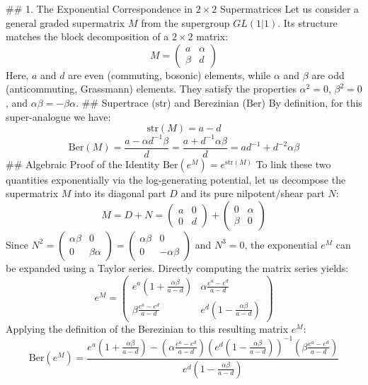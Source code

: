 ## 1. The Exponential Correspondence in $2 \times 2$ Supermatrices
Let us consider a general graded supermatrix $M$ from the supergroup $GL(1\vert{}1)$. Its structure matches the block decomposition of a $2 \times 2$ matrix:
$$M = \begin{pmatrix} a & \alpha \\ \beta & d \end{pmatrix}$$ 
Here, $a$ and $d$ are even (commuting, bosonic) elements, while $\alpha$ and $\beta$ are odd (anticommuting, Grassmann) elements. They satisfy the properties $\alpha^2 = 0$, $\beta^2 = 0$, and $\alpha\beta = -\beta\alpha$.
## Supertrace ($\text{str}$) and Berezinian ($\text{Ber}$)
By definition, for this super-analogue we have:
$$\text{str}(M) = a - d$$ 
$$\text{Ber}(M) = \frac{a - \alpha d^{-1} \beta}{d} = \frac{a + d^{-1}\alpha\beta}{d} = a d^{-1} + d^{-2}\alpha\beta$$ 
## Algebraic Proof of the Identity $\text{Ber}(e^M) = e^{\text{str}(M)}$
To link these two quantities exponentially via the log-generating potential, let us decompose the supermatrix $M$ into its diagonal part $D$ and its pure nilpotent/shear part $N$:
$$M = D + N = \begin{pmatrix} a & 0 \\ 0 & d \end{pmatrix} + \begin{pmatrix} 0 & \alpha \\ \beta & 0 \end{pmatrix}$$ 
Since $N^2 = \begin{pmatrix} \alpha\beta & 0 \\ 0 & \beta\alpha \end{pmatrix} = \begin{pmatrix} \alpha\beta & 0 \\ 0 & -\alpha\beta \end{pmatrix}$ and $N^3 = 0$, the exponential $e^M$ can be expanded using a Taylor series. Directly computing the matrix series yields:
$$e^M = \begin{pmatrix} e^a \left(1 + \frac{\alpha\beta}{a-d}\right) & \alpha \frac{e^a - e^d}{a-d} \\ \beta \frac{e^a - e^d}{a-d} & e^d \left(1 - \frac{\alpha\beta}{a-d}\right) \end{pmatrix}$$ 
Applying the definition of the Berezinian to this resulting matrix $e^M$:
$$\text{Ber}(e^M) = \frac{e^a \left(1 + \frac{\alpha\beta}{a-d}\right) - \left(\alpha \frac{e^a - e^d}{a-d}\right) \left(e^d \left(1 - \frac{\alpha\beta}{a-d}\right)\right)^{-1} \left(\beta \frac{e^a - e^d}{a-d}\right)}{e^d \left(1 - \frac{\alpha\beta}{a-d}\right)}$$ 
